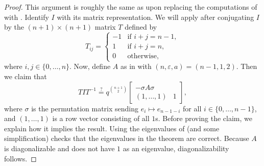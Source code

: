 \begin{proof}
    This argument is roughly the same as  upon replacing the computations of  with .
    Identify $I$ with its matrix representation. We will apply  after conjugating $I$ by the $(n+1)\times(n+1)$ matrix $T$ defined by
    \[T_{ij}=\begin{cases}
        -1 & \text{if }i+j=n-1, \\
        1 & \text{if }i+j=n, \\
        0 & \text{otherwise},
    \end{cases}\]
    where $i,j\in\{0,\ldots,n\}$.
    Now, define $A$ as in  with $(n,\varepsilon,a)=(n-1,1,2)$. Then we claim that
    \begin{equation}
        TIT^{-1}\stackrel?=q^{\binom{n+1}2}\begin{bmatrix}
            -\sigma A\sigma \\
            (1,\ldots,1) & 1
        \end{bmatrix}, \label{eq:conjugate-sp-trivial}
    \end{equation}
    where $\sigma$ is the permutation matrix sending $e_i\mapsto e_{n-1-i}$ for all $i\in\{0,\ldots,n-1\}$, and $(1,\ldots,1)$ is a row vector consisting of all $1$s. Before proving the claim, we explain how it implies the result. Using the eigenvalues of  (and some simplification) checks that the eigenvalues in the theorem are correct. Because $A$ is diagonalizable and does not have $1$ as an eigenvalue, diagonalizability follows.


\end{proof}
